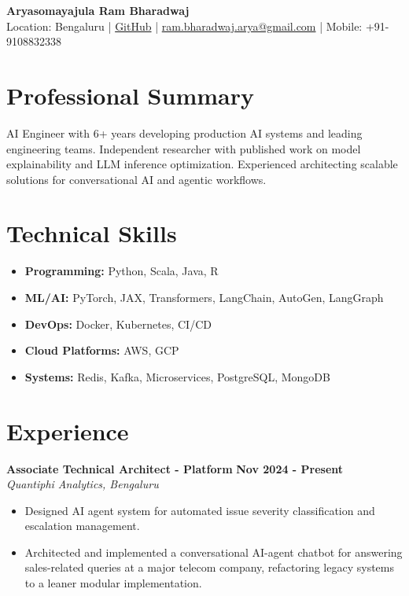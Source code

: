 \documentclass[11pt]{article}
\begin{document}
\begin{center}
\textbf{\Large Aryasomayajula Ram Bharadwaj} \\
\vspace{4pt}
Location: Bengaluru | \href{https://github.com/rokosbasilisk}{GitHub} | \href{mailto:ram.bharadwaj.arya@gmail.com}{ram.bharadwaj.arya@gmail.com} | Mobile: +91-9108832338
\end{center}

\vspace{12pt}
\section{Professional Summary}
AI Engineer with 6+ years developing production AI systems and leading engineering teams. Independent researcher with published work on model explainability and LLM inference optimization. Experienced architecting scalable solutions for conversational AI and agentic workflows.

\section{Technical Skills}
\begin{itemize}[leftmargin=*, nosep]
\item \textbf{Programming:} Python, Scala, Java, R
\item \textbf{ML/AI:} PyTorch, JAX, Transformers, LangChain, AutoGen, LangGraph
\item \textbf{DevOps:} Docker, Kubernetes, CI/CD
\item \textbf{Cloud Platforms:} AWS, GCP
\item \textbf{Systems:} Redis, Kafka, Microservices, PostgreSQL, MongoDB
\end{itemize}


\section{Experience}

\textbf{Associate Technical Architect - Platform} \hfill \textbf{Nov 2024 - Present} \\
\textit{Quantiphi Analytics, Bengaluru}
\begin{itemize}[leftmargin=*, nosep]
\item Designed AI agent system for automated issue severity classification and escalation management.
\item Architected and implemented a conversational AI-agent chatbot for answering sales-related queries at a major telecom company, refactoring legacy systems to a leaner modular implementation.
\end{itemize}
\end{document}

